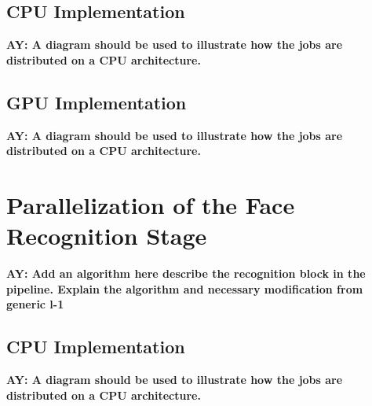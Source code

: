 \documentclass[10pt,twocolumn,letterpaper]{article}
\begin{document}
\subsection{CPU Implementation}

{\bf AY: A diagram should be used to illustrate how the jobs are distributed on a CPU architecture.}

\subsection{GPU Implementation}
{\bf AY: A diagram should be used to illustrate how the jobs are distributed on a CPU architecture.}

\section{Parallelization of the Face Recognition Stage}
\label{sec:recognition}
{\bf AY: Add an algorithm here describe the recognition block in the pipeline. Explain the algorithm and necessary modification from generic l-1}

\subsection{CPU Implementation}
{\bf AY: A diagram should be used to illustrate how the jobs are distributed on a CPU architecture.}
\end{document}
